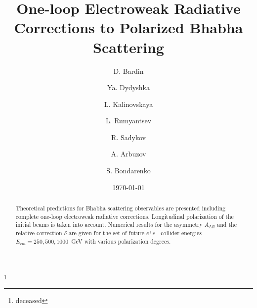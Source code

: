 \documentclass[%
 reprint,
amsmath,
amssymb,
 aps,
 prb,
 floatfix,
]{revtex4-1}
\begin{document}

\title{One-loop Electroweak Radiative Corrections to Polarized Bhabha Scattering}%

\author{D. Bardin}\thanks{deceased}
\author{Ya. Dydyshka}%
\author{L. Kalinovskaya}%
\author{L. Rumyantsev}%
\author{R. Sadykov}%
%

\author{A. Arbuzov}
\author{S. Bondarenko}
%

\date{\today}%

\begin{abstract}
Theoretical predictions for Bhabha scattering observables are presented 
including complete one-loop electroweak radiative corrections. Longitudinal 
polarization of the initial beams is taken into account.
Numerical results for the asymmetry $A_{LR}$ and the relative correction $\delta$ 
are given for the set of future $e^+e^-$ collider energies $E_{cm}=250, 500, 1000$~GeV 
with various polarization degrees.
\end{abstract}

\maketitle

%
\end{document}
